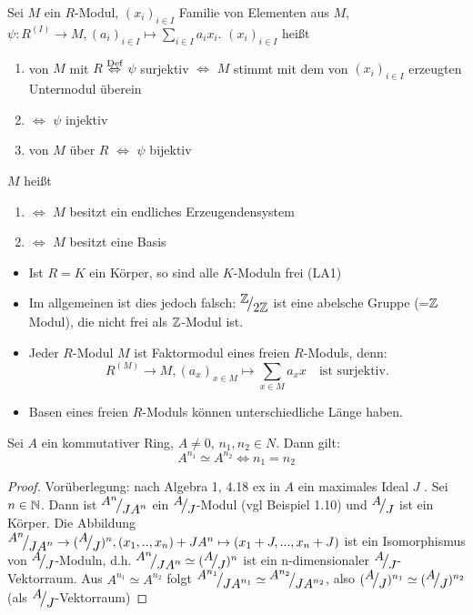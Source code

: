 \begin{df}\label{1.21}
	Sei $M$ ein $R$-Modul, $(x_i)_{i \in I} $ Familie von Elementen aus $M$, $\psi:R^{(I)} \to M, (a_i)_{i \in I} \mapsto \sum_{i\in I}a_ix_i$.
	$(x_i)_{i \in I} $ heißt 
	\begin{enumerate}
		\item[]  von $M$ mit $R$ $\overset{\text{Def}}{\Leftrightarrow}$  $\psi $ surjektiv $\Longleftrightarrow$ $M$ stimmt mit dem von $(x_i)_{i \in I} $ erzeugten Untermodul überein
		\item[]	 $\Longleftrightarrow$ $\psi $ injektiv 
		\item[]  von $M$ über $R$ $\Longleftrightarrow$ $\psi$ bijektiv 
	\end{enumerate}
	$M$ heißt
	\begin{enumerate}
		\item[]	  $\Longleftrightarrow$ $M$ besitzt ein endliches Erzeugendensystem 
		\item[]  $\Longleftrightarrow$ $M$ besitzt eine Basis
	\end{enumerate}
\end{df}
\begin{anm}
	\begin{itemize}
		\item Ist $R=K$ ein Körper, so sind alle $K$-Moduln frei (LA1)
		\item Im allgemeinen ist dies jedoch falsch: $\QR{\Z}{2\Z} $ ist eine abelsche Gruppe (=$\mathbb{Z}$ Modul), die nicht frei als $\mathbb{Z}$-Modul ist.
		\item Jeder $R$-Modul $M$ ist Faktormodul eines freien $R$-Moduls, denn: $$ R^{(M)} \to M, (a_x)_{ x \in M} \mapsto \sum_{x\in M}a_{x}x \quad \text{ist surjektiv}.$$
		\item Basen eines freien $R$-Moduls können unterschiedliche Länge haben.
	\end{itemize}
\end{anm}
\begin{sa}\label{1.22}
	Sei $A$ ein kommutativer Ring, $A \neq 0$, $n_1,n_2 \in N $. Dann gilt: \\
	$$ A^{n_1} \simeq A^{n_2} \Longleftrightarrow n_1 =n_2 $$
\end{sa}
\begin{proof}
	Vorüberlegung: nach Algebra 1, 4.18 ex in $A$ ein maximales Ideal $J$ . Sei $n \in \mathbb{N}$. Dann ist $\QR{A^{n}}{JA^{n}}$ ein $\QR{A}{J}$-Modul (vgl Beispiel 1.10) und $\QR{A}{J}$ ist ein Körper. Die Abbildung $\QR{A^{n}}{JA^{n}} \to (\QR{A}{J})^{n}, (x_1,..,x_n) +JA^{n} \mapsto (x_1+J,...,x_n+J) $ ist ein Isomorphismus von $\QR{A}{J}$-Moduln, d.h. $\QR{A^{n}}{JA^{n}} \simeq (\QR{A}{J})^{n} $ ist ein n-dimensionaler $\QR{A}{J}$-Vektorraum. Aus $ A^{n_1} \simeq A^{n_2}$ folgt $\QR{A^{n_1}}{JA^{n_1}} \simeq \QR{A^{n_2}}{JA^{n_2}}$, also $ (\QR{A}{J})^{n_1} \simeq (\QR{A}{J})^{n_2}$ (als $\QR{A}{J}$-Vektorraum)
\end{proof}
